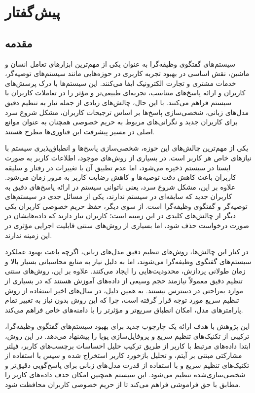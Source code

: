 
\chapter{پیش گفتار}

\section{مقدمه}

سیستم‌های گفتگوی وظیفه‌گرا به عنوان یکی از مهم‌ترین ابزارهای تعامل انسان و ماشین، نقش اساسی در بهبود تجربه کاربری در حوزه‌هایی مانند سیستم‌های توصیه‌گر، خدمات مشتری و تجارت الکترونیک ایفا می‌کنند. این سیستم‌ها با درک پرسش‌های کاربران و ارائه پاسخ‌های متناسب، تجربه‌ای طبیعی‌تر و مؤثر را در تعاملات کاربران با سیستم فراهم می‌کنند. با این حال، چالش‌های زیادی از جمله نیاز به تنظیم دقیق مدل‌های زبانی، شخصی‌سازی پاسخ‌ها بر اساس ترجیحات کاربران، مشکل شروع سرد برای کاربران جدید و نگرانی‌های مربوط به حریم خصوصی همچنان به عنوان موانع اصلی در مسیر پیشرفت این فناوری‌ها مطرح هستند.  

یکی از مهم‌ترین چالش‌های این حوزه، شخصی‌سازی پاسخ‌ها و انطباق‌پذیری سیستم با نیازهای خاص هر کاربر است. در بسیاری از روش‌های موجود، اطلاعات کاربر به صورت ایستا در سیستم ذخیره می‌شود، اما عدم تطبیق آن با تغییرات در رفتار و سلیقه کاربران باعث کاهش دقت توصیه‌ها و کاهش رضایت کاربر به مرور زمان می‌شود. علاوه بر این، مشکل شروع سرد، یعنی ناتوانی سیستم در ارائه پاسخ‌های دقیق به کاربران جدید که سابقه‌ای در سیستم ندارند، یکی از مسائل جدی در سیستم‌های توصیه‌گر و گفتگوی وظیفه‌گرا است. از سوی دیگر، حفظ حریم خصوصی کاربران یکی دیگر از چالش‌های کلیدی در این زمینه است؛ کاربران نیاز دارند که داده‌هایشان در صورت درخواست حذف شود، اما بسیاری از روش‌های سنتی قابلیت اجرایی مؤثری در این زمینه ندارند.  

در کنار این چالش‌ها، روش‌های تنظیم دقیق مدل‌های زبانی، اگرچه باعث بهبود عملکرد سیستم‌های گفتگوی وظیفه‌گرا می‌شوند، اما به دلیل نیاز به منابع محاسباتی بسیار بالا و زمان طولانی پردازش، محدودیت‌هایی را ایجاد می‌کنند. علاوه بر این، روش‌های سنتی تنظیم دقیق معمولاً نیازمند حجم وسیعی از داده‌های آموزش هستند که در بسیاری از موارد به‌راحتی در دسترس نیستند. به همین دلیل، در سال‌های اخیر استفاده از روش تنظیم سریع مورد توجه قرار گرفته است، چرا که این روش بدون نیاز به تغییر تمام پارامترهای مدل، امکان انطباق سریع‌تر و مؤثرتر را با دامنه‌های خاص فراهم می‌کند.  

این پژوهش با هدف ارائه یک چارچوب جدید برای بهبود سیستم‌های گفتگوی وظیفه‌گرا، ترکیبی از تکنیک‌های تنظیم سریع و پروفایل‌سازی پویا را پیشنهاد می‌دهد. در این روش، ابتدا داده‌های مرتبط با کاربر از طریق ترکیب حلیل احساسات برچسب‌های کاربر، فیلتر مشارکتی مبتنی بر آیتم، و تحلیل بازخورد کاربر استخراج شده و سپس با استفاده از تکنیک‌های تنظیم سریع و با استفاده از قدرت مدل های زبانی برای پاسخ‌گویی دقیق‌تر و شخصی‌سازی‌شده تنظیم می‌شود. این سیستم همچنین امکان حذف داده‌های کاربر را مطابق با حق فراموشی فراهم می‌کند تا از حریم خصوصی کاربران محافظت شود.  

